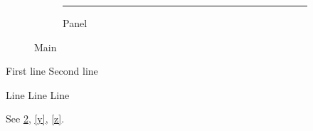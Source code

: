 \documentclass{article}
\begin{document}
\begin{figure}
\begin{subfigure}{0.4\linewidth}
\rule{1cm}{1cm}
\caption{Panel}\label{x}
\end{subfigure}
\caption{Main}\label{x}
\end{figure}
\begin{algorithm}
First line\;
Second line\;
\caption{Alg.}\label{y}
\end{algorithm}
\begin{algorithm}
\caption{Alg two.}\label{z}
Line\;
Line\;
Line\;\label{z}
\end{algorithm}
See \ref{x}, \ref{y}, \ref{z}.
\end{document}
